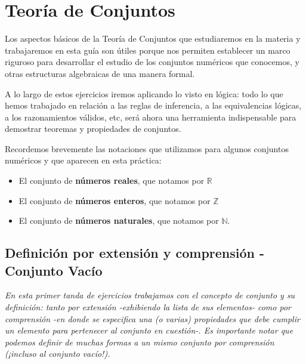 \chapter{Teor\'ia de Conjuntos}

Los aspectos básicos de la Teoría de Conjuntos que estudiaremos en la materia y trabajaremos en esta guía son útiles porque nos permiten establecer un marco riguroso para desarrollar el estudio de los conjuntos numéricos que conocemos, y otras estructuras algebraicas de una manera formal.

A lo largo de estos ejercicios iremos aplicando lo visto en lógica: todo lo que hemos trabajado en relación a las reglas
de inferencia, a las equivalencias lógicas, a los razonamientos válidos, etc, será ahora una herramienta indispensable para
demostrar teoremas y propiedades de conjuntos.

Recordemos brevemente las notaciones que utilizamos para algunos conjuntos numéricos y que aparecen en esta
práctica:

\begin{itemize}
	\item El conjunto de \textbf{números reales}, que notamos por $\mathbb{R}$
	
	\item El conjunto de \textbf{números enteros}, que notamos por $\mathbb{Z}$
	
	\item El conjunto de \textbf{números naturales}, que notamos por $\mathbb{N}$.
\end{itemize}

\hspace*{-1.5cm}

\section{Definici\'on por extensi\'on y comprensi\'on - Conjunto Vac\'io}

\textit{En esta primer tanda de ejercicios trabajamos con el concepto de conjunto y su definición: tanto por extensión -exhibiendo la lista de sus elementos- como por comprensión -en donde se especifica una (o varias) propiedades que debe cumplir un elemento para pertenecer al conjunto en cuestión-. Es importante notar que podemos definir de muchas formas a un mismo conjunto por comprensión (¡incluso al conjunto vacío!).}\\

